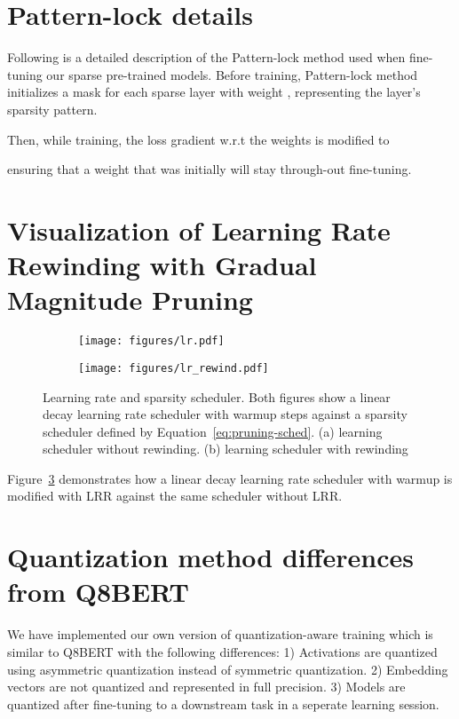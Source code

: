 \documentclass{article}
\begin{document}
\section{Pattern-lock details}
\label{app:pattern-lock}
Following is a detailed description of the Pattern-lock method used when fine-tuning our sparse pre-trained models.
Before training, Pattern-lock method initializes a mask  for each sparse layer  with weight , representing the layer's sparsity pattern.

Then, while training, the loss  gradient w.r.t the weights is modified to

ensuring that a weight that was initially  will stay  through-out fine-tuning.

\section{Visualization of Learning Rate Rewinding with Gradual Magnitude Pruning}
\label{app:lrr-visual}
\begin{figure}[t]
    \centering
    \begin{subfigure}[b]{0.49\textwidth}
        \centering
        \texttt{[image: figures/lr.pdf]}
        \caption{}
        \label{fig:lr_norewind_sparsity_sched}
    \end{subfigure}
    \hfill
    \begin{subfigure}[b]{0.49\textwidth}
        \centering
        \texttt{[image: figures/lr\_rewind.pdf]}
        \caption{}
        \label{fig:lr_rewind_sparsity_sched}
    \end{subfigure}
    \caption{Learning rate and sparsity scheduler. Both figures show a linear decay learning rate scheduler with  warmup steps against a sparsity scheduler defined by Equation~\ref{eq:pruning-sched}. (a) learning scheduler without rewinding. (b) learning scheduler with rewinding}
    \label{fig:lr_sparsity_sched}
\end{figure}
Figure~\ref{fig:lr_sparsity_sched} demonstrates how a linear decay learning rate scheduler with warmup is modified with LRR against the same scheduler without LRR.

\section{Quantization method differences from Q8BERT}
\label{app:quantization}
We have implemented our own version of quantization-aware training which is similar to Q8BERT with the following differences:
1) Activations are quantized using asymmetric quantization instead of symmetric quantization.
2) Embedding vectors are not quantized and represented in full precision.
3) Models are quantized after fine-tuning to a downstream task in a seperate learning session.
\end{document}
